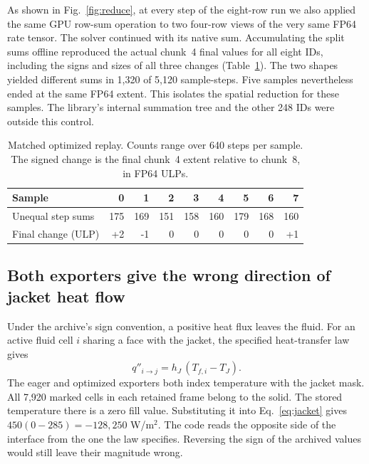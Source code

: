 \documentclass{article}
\begin{document}
As shown in Fig.~\ref{fig:reduce}, at every step of the eight-row run we also applied the same GPU row-sum operation to two four-row views of the very same FP64 rate tensor. The solver continued with its native sum. Accumulating the split sums offline reproduced the actual chunk~4 final values for all eight IDs, including the signs and sizes of all three changes (Table~\ref{tab:control}). The two shapes yielded different sums in 1,320 of 5,120 sample-steps. Five samples nevertheless ended at the same FP64 extent. This isolates the spatial reduction for these samples. The library's internal summation tree and the other 248 IDs were outside this control.

\begin{table}[ht]\centering\small
\caption{Matched optimized replay. Counts range over 640 steps per sample. The signed change is the final chunk~4 extent relative to chunk~8, in FP64 ULPs.}\label{tab:control}
\begin{tabular}{lrrrrrrrr}\toprule
Sample & 0 & 1 & 2 & 3 & 4 & 5 & 6 & 7\\
\midrule
Unequal step sums & 175 & 169 & 151 & 158 & 160 & 179 & 168 & 160\\
Final change (ULP) & +2 & -1 & 0 & 0 & 0 & 0 & 0 & +1\\
\bottomrule\end{tabular}\end{table}

\subsection{Both exporters give the wrong direction of jacket heat flow}\label{sec:flux-result}
Under the archive's sign convention, a positive heat flux leaves the fluid. For an active fluid cell $i$ sharing a face with the jacket, the specified heat-transfer law gives
\begin{equation}
q''_{i\to j}=h_J\,(T_{f,i}-T_J).
\label{eq:jacket}
\end{equation}
The eager and optimized exporters both index temperature with the jacket mask. All 7,920 marked cells in each retained frame belong to the solid. The stored temperature there is a zero fill value. Substituting it into Eq.~\eqref{eq:jacket} gives $450(0-285)=-128{,}250$ W/m$^2$. The code reads the opposite side of the interface from the one the law specifies. Reversing the sign of the archived values would still leave their magnitude wrong.
\end{document}
